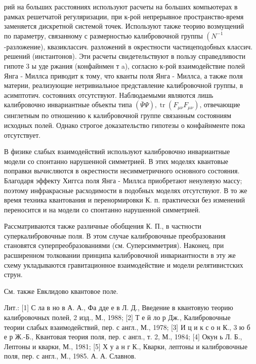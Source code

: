 \documentclass[10pt]{article}
\begin{document}
рий на больших расстояниях используют расчеты на больших компьютерах в рамках решетчатой регуляризации, при к-рой непрерывное пространство-время заменяется дискретной системой точек. Используют также теорию возмущений по параметру, связанному с размерностью калибровочной группы $\left(N^{-1}\right.$-разложение), квазиклассич. разложений в окрестности частицеподобных классич. решений (инстантонов). Эти расчеты свидетельствуют в пользу справедливости гипоте 3 ы уде ржания (конфайнмен т a), согласно к-рой взаимодействие полей Янга - Миллса приводит к тому, что кванты поля Янга - Миллса, а также поля материи, реализующие нетривиальное представление калибровочной группы, в асимптотич. состояниях отсутствуют. Наблюдаемыми являются лишь калибровочно инвариантные объекты типа $(\bar{\Psi} \Psi), \operatorname{tr}\left(F_{\mu \nu} F_{\mu \nu}\right)$, отвечающие синглетным по отношению к калибровочной группе связанным состояниям исходных полей. Однако строгое доказательство гипотезы о конфайнменте пока отсутствует.



В физике слабых взаимодействий используют калибровочно инвариантные модели со спонтанно нарушенной симметрией. В этих моделях квантовые поправки вычисляются в окрестности несимметричного основного состояния. Благодаря эффекту Хиггса поля Янга - Миллса приобретают ненулевую массу; поэтому инфракрасные расходимости в подобных моделях отсутствуют. В то же время техника квантования и перенормировки К. п. практически без изменений переносится и на модели со спонтанно нарушенной симметрией.



Рассматриваются также различные обобщения К. П., в частности суперкалибровочные поля. В этом случае калибровочные преобразования становятся суперпреобразованиями (см. Суперсимметрия). Наконец, при расширенном толковании принципа калибровочной инвариантности в эту же схему укладываются гравитационное взаимодействие и модели релятивистских струн.



См. также Евклидово квантовое поле.



Лит.: [1] С ла в но в А. А., Фа дде е в Л. Д., Введение в квантовую теорию калибровочных полей, 2 изд., М., 1988; [2] Т е й ло р Дж., Калибровочные теории слабых взаимодействий, пер. с англ., М., 1978; [3] И ц и к с о н К., 3 ю б е р Ж.-Б., Квантовая теория поля, пер. с англ., т. 2, М., 1984; [4] Окун ь Л. Б., Лептоны и кварки, М., 1981; [5] Х у а н г К., Кварки, лептоны и калибровочные поля, пер. с англ., М., 1985. А. А. Славнов.
\end{document}
